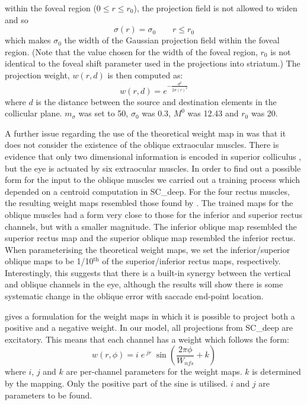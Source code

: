 within the foveal region ($0 \leq r \leq r_0$), the projection field
is not allowed to widen and so
\begin{equation} \label{eq:sigmar2}
\sigma(r) = \sigma_0 \qquad r \leq r_0
\end{equation}
which makes $\sigma_0$ the width of the Gaussian projection field
within the foveal region. (Note that the value chosen for the width
of the foveal region, $r_0$ is not identical to the foveal shift parameter used
in the  projections into striatum.)
The  projection weight, $w(r,d)$ is then
computed as:
\begin{equation} \label{eq:widening}
w(r,d) = e^{-\frac{d^2}{2\sigma\left(r\right)^2}}
\end{equation}
where $d$ is the distance between the source and destination
elements in the collicular plane.  $m_\sigma$ was set to 50, $\sigma_0$
was 0.3, $M^0$ was 12.43 and $r_0$ was 20.

A further issue regarding the use of the theoretical weight map
in \cite{tabareau_geometry_2007} was that it does not consider the
existence of the oblique extraocular muscles. There is evidence that
only two dimensional information is encoded in superior
colliculus \citep{wurtz_activity_1972,hepp_monkey_1993,van_opstal_two-rather_1991}, but the
eye is actuated by six extraocular muscles. In order to find out a
possible form for the input to the oblique muscles we carried out a
training process
which depended on a
centroid computation in SC\_deep. For the four rectus muscles, the
resulting weight maps resembled those found by
\cite{arai_two-dimensional_1994}. The trained
maps for the oblique muscles had a form very close to those for the
inferior and superior rectus channels, but with a smaller magnitude.
The inferior oblique map resembled the superior rectus map and the
superior oblique map resembled the inferior rectus. When parameterising
the theoretical weight maps, we set the inferior/superior
oblique maps to be 1/10$^{\mathrm{th}}$ of the superior/inferior rectus
maps, respectively. Interestingly, this suggests that there is a built-in
synergy between the vertical and oblique channels in the eye, although
the results will show there is some systematic change in the oblique error
with saccade end-point location.

\cite{tabareau_geometry_2007} gives a formulation for the weight maps
in which it is possible to project both a positive and a negative
weight. In our model, all projections from SC\_deep are excitatory.
This means that each channel has a weight which follows the form:
\begin{equation} \label{eq:weightmaps}
w(r,\phi) = i\;e\,^{jr}\;\sin\left(\frac{2\pi\phi}{W_{nfs}} + k\right)
\end{equation}
where $i$, $j$ and $k$ are per-channel parameters for the weight
maps. $k$ is determined by the mapping. Only the positive part of the
sine is utilised. $i$ and $j$ are parameters to be found.

